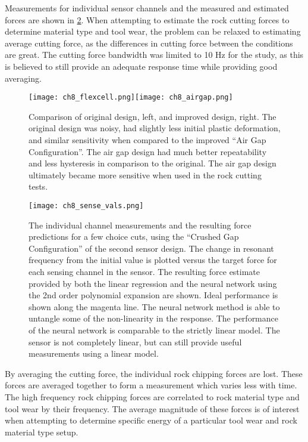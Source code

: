 Measurements for individual sensor channels and the measured 
and estimated forces are shown in \ref{fig:sense_chans}.
When attempting to estimate the rock cutting forces to determine material type and tool wear, 
the problem can be relaxed to estimating average cutting force, as the differences in 
cutting force between the conditions are great.
The cutting force bandwidth was limited to 10 Hz for the study, as this is believed to still
provide an adequate response time while providing good averaging.

\begin{figure}[ht]
\centering
\texttt{[image: ch8\_flexcell.png]}\texttt{[image: ch8\_airgap.png]}
\caption{
Comparison of original design, left, and improved design, right.
The original design was noisy, had slightly less initial plastic deformation,
and similar sensitivity when compared to the improved ``Air Gap Configuration''.
The air gap design had much better repeatability and less hysteresis in comparison 
to the original.
The air gap design ultimately became more sensitive when used in the rock cutting tests.
}
\label{fig:xycompare}
\end{figure}

\begin{figure}[h]
\centering
\texttt{[image: ch8\_sense\_vals.png]}
\caption{
The individual channel measurements and the resulting force predictions for a few choice cuts,
using the ``Crushed Gap Configuration'' of the second sensor design.
The change in resonant frequency from the initial value is plotted versus the target force
for each sensing channel in the sensor. The resulting force estimate provided by both the 
linear regression and the neural network using the 2nd order polynomial expansion are shown.
Ideal performance is shown along the magenta line. 
The neural network method is able to untangle some of the non-linearity in the response.
The performance of the neural network is comparable to the strictly linear model.
The sensor is not completely linear, but can still provide useful measurements using a linear model.
}
\label{fig:sense_chans}
\end{figure}

By averaging the cutting force, the individual rock chipping forces are lost.
These forces are averaged together to form a measurement which varies less with time.
The high frequency rock chipping forces are correlated to rock material type and tool wear 
by their frequency. The average magnitude of these forces is of interest when attempting 
to determine specific energy of a particular tool wear and rock material type setup.

